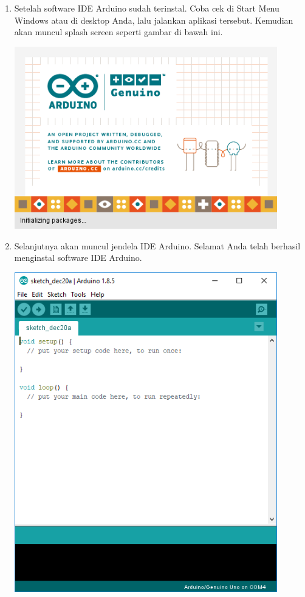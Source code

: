 \begin{enumerate}
\item Setelah software IDE Arduino sudah terinstal. Coba cek di Start Menu Windows atau di desktop Anda, lalu jalankan aplikasi tersebut. Kemudian akan muncul splash screen seperti gambar di bawah ini.
\break\\
\centerline{\includegraphics[width=0.9\textwidth]{figures/aride11.png}}
\item Selanjutnya akan muncul jendela IDE Arduino. Selamat Anda telah berhasil menginstal software IDE Arduino.
\break\\
\centerline{\includegraphics[width=0.9\textwidth]{figures/aride12.png}}
\end{enumerate}

